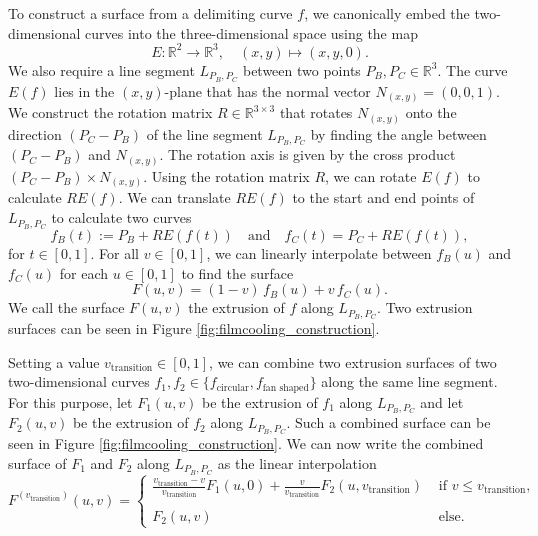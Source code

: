 \documentclass[a4paper, 11pt]{report}
\theoremstyle{definition}
\begin{document}
	To construct a surface from a delimiting curve $f$, we canonically embed the two-dimensional curves into the three-dimensional space using the map
		$$ E: \mathbb{R}^2 \rightarrow \mathbb{R}^3, \quad (x, y) \mapsto (x, y, 0). $$
	We also require a line segment $L_{P_B,P_C}$ between two points $P_B, P_C \in \mathbb{R}^3$.
	The curve $E(f)$ lies in the $(x,y)$-plane that has the normal vector $N_{(x,y)} = (0, 0, 1)$. We construct the rotation matrix $R \in \mathbb{R}^{3 \times 3}$ that rotates $N_{(x,y)}$ onto the direction $(P_C-P_B)$ of the line segment $L_{P_B,P_C}$ by finding the angle between $(P_C-P_B)$ and $N_{(x,y)}$. The rotation axis is given by the cross product $(P_C-P_B) \times N_{(x,y)}$. Using the rotation matrix $R$, we can rotate $E(f)$ to calculate $RE(f)$. We can translate $RE(f)$ to the start and end points of $L_{P_B,P_C}$ to calculate two curves
		$$ f_B(t) := P_B+RE(f(t)) \quad\textrm{and}\quad f_C(t) = P_C+RE(f(t)), $$
	for $t \in [0,1]$.
	For all $v \in [0,1]$, we can linearly interpolate between $f_B(u)$ and $f_C(u)$ for each $u \in [0,1]$ to find the surface 
		$$F(u,v) = (1-v)\,f_B(u) + v\,f_C(u).$$
	We call the surface $F(u,v)$ the extrusion of $f$ along $L_{P_B,P_C}$. Two extrusion surfaces can be seen in Figure \ref{fig:filmcooling_construction}.

	Setting a value $v_\textrm{transition} \in [0,1]$, we can combine two extrusion surfaces of two two-dimensional curves $f_1, f_2 \in \{f_\textrm{circular}, f_\textrm{fan shaped}\}$ along the same line segment. For this purpose, let $F_1(u,v)$ be the extrusion of $f_1$ along $L_{P_B,P_C}$ and let $F_2(u,v)$ be the extrusion of $f_2$ along $L_{P_B,P_C}$. Such a combined surface can be seen in Figure \ref{fig:filmcooling_construction}. We can now write the combined surface of $F_1$ and $F_2$ along $L_{P_B,P_C}$ as the linear interpolation
		$$
			F^{(v_\textrm{transition})}(u,v) = 
				\begin{cases}
					\frac{v_\textrm{transition}-v}{v_\textrm{transition}} F_1(u,0) + 
					\frac{v}{v_\textrm{transition}} F_2(u,v_\textrm{transition})
					& \textrm{ if } v \leq v_\textrm{transition}, \\

					\\[-0.5em]
					
					F_2(u,v)
					& \textrm{ else.} 
				\end{cases}
		$$
\end{document}
